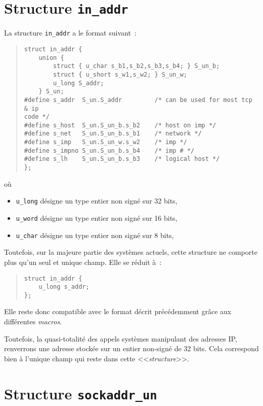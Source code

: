 \begin{appendix}
\section{\label{ann-struct-inaddr}Structure {\tt in\_addr}}

La structure {\tt in\_addr} a le format suivant~:
\begin{quote}
\begin{verbatim}
struct in_addr {
    union {
        struct { u_char s_b1,s_b2,s_b3,s_b4; } S_un_b;
        struct { u_short s_w1,s_w2; } S_un_w;
        u_long S_addr;
    } S_un;
#define s_addr  S_un.S_addr         /* can be used for most tcp & ip
code */
#define s_host  S_un.S_un_b.s_b2    /* host on imp */
#define s_net   S_un.S_un_b.s_b1    /* network */
#define s_imp   S_un.S_un_w.s_w2    /* imp */
#define s_impno S_un.S_un_b.s_b4    /* imp # */
#define s_lh    S_un.S_un_b.s_b3    /* logical host */
};
\end{verbatim}
\end{quote}
o{\`u} 
\begin{itemize}
	\item {\tt u\_long} d{\'e}signe un type entier non sign{\'e} sur 32 bits,
	\item {\tt u\_word} d{\'e}signe un type entier non sign{\'e} sur 16 bits,
	\item {\tt u\_char} d{\'e}signe un type entier non sign{\'e} sur 8 bits,
\end{itemize}

Toutefois, sur la majeure partie des syst{\`e}mes {\Unix} actuels, cette structure
ne comporte plus qu'un seul et unique champ. Elle se r{\'e}duit {\`a}~:
\begin{quote}
\begin{verbatim}
struct in_addr {
    u_long s_addr;
};
\end{verbatim}
\end{quote}

Elle reste donc compatible avec le format d{\'e}crit pr{\'e}c{\'e}demment gr{\^a}ce aux diff{\'e}rentes
{\it macros}.

Toutefois, la quasi-totalit{\'e} des appels syst{\`e}mes manipulant des adresses IP, renverrons une
adresse stock{\'e}e sur un entier non-sign{\'e} de 32 bits.
Cela correspond bien {\`a} l'unique champ qui reste dans cette <<{\sl structure}>>.

\section{\label{ann-struct-sockaddrun}Structure {\tt sockaddr\_un}}


\end{appendix}
